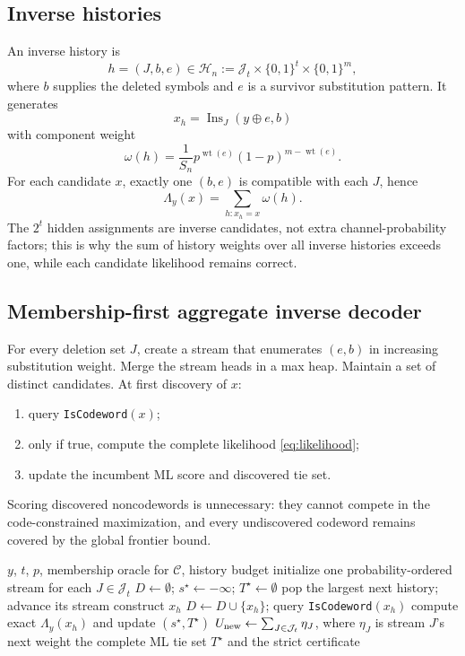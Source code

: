 \documentclass[11pt]{article}
\theoremstyle{definition}
\theoremstyle{remark}
\newcommand{\C}{\mathcal C}
\newcommand{\J}{\mathcal J}
\newcommand{\Hh}{\mathcal H}
\newcommand{\wt}{\operatorname{wt}}
\begin{document}
\subsection{Inverse histories}
An inverse history is
\[
h=(J,b,e)\in\Hh_n:=\J_t\times\{0,1\}^t\times\{0,1\}^m,
\]
where $b$ supplies the deleted symbols and $e$ is a survivor substitution pattern.  It generates
\[
x_h=\operatorname{Ins}_{J}(y\oplus e,b)
\]
with component weight
\begin{equation}
\omega(h)=\frac1{S_n}p^{\wt(e)}(1-p)^{m-\wt(e)}.
\label{eq:component}
\end{equation}
For each candidate $x$, exactly one $(b,e)$ is compatible with each $J$, hence
\[
\Lambda_y(x)=\sum_{h:x_h=x}\omega(h).
\]
The $2^t$ hidden assignments are inverse candidates, not extra channel-probability factors; this is why the sum of history weights over all inverse histories exceeds one, while each candidate likelihood remains correct.

\subsection{Membership-first aggregate inverse decoder}
For every deletion set $J$, create a stream that enumerates $(e,b)$ in increasing substitution weight.  Merge the stream heads in a max heap.  Maintain a set of distinct candidates.  At first discovery of $x$:
\begin{enumerate}[label=(\alph*),leftmargin=2em]
\item query \texttt{IsCodeword}$(x)$;
\item only if true, compute the complete likelihood \eqref{eq:likelihood};
\item update the incumbent ML score and discovered tie set.
\end{enumerate}
Scoring discovered noncodewords is unnecessary: they cannot compete in the code-constrained maximization, and every undiscovered codeword remains covered by the global frontier bound.

\begin{algorithm}[t]
\caption{Certified fixed-edit FIBER search}
\begin{algorithmic}[1]
\Require $y$, $t$, $p$, membership oracle for $\C$, history budget
\State initialize one probability-ordered stream for each $J\in\J_t$
\State $D\gets\emptyset$; $s^\star\gets-\infty$; $T^\star\gets\emptyset$
  \State pop the largest next history; advance its stream
  \State construct $x_h$
    \State $D\gets D\cup\{x_h\}$; query \texttt{IsCodeword}$(x_h)$
    \If{$x_h\in\C$}
      \State compute exact $\Lambda_y(x_h)$ and update $(s^\star,T^\star)$
    \EndIf
  \EndIf
  \State $U_{\rm new}\gets\sum_{J\in\J_t}\eta_J$, where $\eta_J$ is stream $J$'s next weight
    \State \Return the complete ML tie set $T^\star$ and the strict certificate
  \EndIf
\EndWhile
\end{algorithmic}
\end{algorithm}
\end{document}
